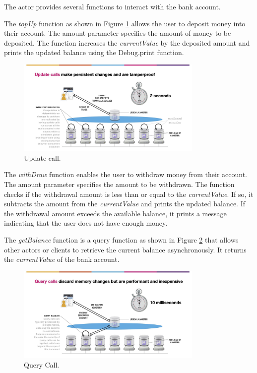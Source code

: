The actor provides several functions to interact with the bank account.


The \textit{topUp} function as shown in Figure \ref{fig:Update Call} allows the user to deposit money into their account. The amount parameter specifies the amount of money to be deposited. The function increases the \textit{currentValue} by the deposited amount and prints the updated balance using the Debug.print function.

\begin{figure}[H]
    \centering
    \includegraphics[width=0.8\textwidth]{update-calls.jpeg}
    \caption{Update call.}
    \label{fig:Update Call}
\end{figure}

The \textit{withDraw} function enables the user to withdraw money from their account. The amount parameter specifies the amount to be withdrawn. The function checks if the withdrawal amount is less than or equal to the \textit{currentValue}. If so, it subtracts the amount from the \textit{currentValue} and prints the updated balance. If the withdrawal amount exceeds the available balance, it prints a message indicating that the user does not have enough money.


The \textit{getBalance} function is a query function as shown in Figure \ref{fig:Query Call} that allows other actors or clients to retrieve the current balance asynchronously. It returns the \textit{currentValue} of the bank account.

\begin{figure}[H]
    \centering
    \includegraphics[width=0.8\textwidth]{query-calls.jpeg}
    \caption{Query Call.}
    \label{fig:Query Call}
\end{figure}

